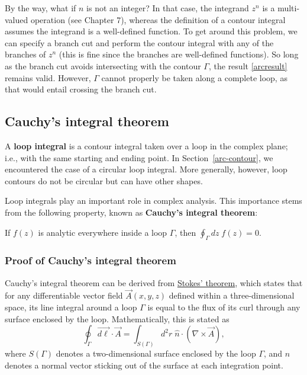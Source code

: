 \documentclass[10pt,a4paper]{article}
\begin{document}
By the way, what if $n$ is not an integer? In that case, the integrand
$z^n$ is a multi-valued operation (see Chapter 7), whereas the
definition of a contour integral assumes the integrand is a
well-defined function. To get around this problem, we can specify a
branch cut and perform the contour integral with any of the branches
of $z^n$ (this is fine since the branches are well-defined
functions). So long as the branch cut avoids intersecting with the
contour $\Gamma$, the result \eqref{arcresult} remains valid.
However, $\Gamma$ cannot properly be taken along a complete loop, as
that would entail crossing the branch cut.

\subsection{Cauchy's integral theorem}
\label{cauchys-integral-theorem}

A \textbf{loop integral} is a contour integral taken over a loop in
the complex plane; i.e., with the same starting and ending point.  In
Section~\ref{arc-contour}, we encountered the case of a circular loop
integral. More generally, however, loop contours do not be circular
but can have other shapes.

Loop integrals play an important role in complex analysis. This
importance stems from the following property, known as \textbf{Cauchy's
integral theorem}:

\begin{framed}
\centering
\noindent
If $f(z)$ is analytic everywhere inside a loop $\Gamma$, then
$\displaystyle\oint_\Gamma dz\; f(z) = 0.$
\end{framed}

\subsubsection{Proof of Cauchy's integral theorem}
\label{proof-of-cauchys-integral-theorem}

Cauchy's integral theorem can be derived from
\href{http://en.wikipedia.org/wiki/Stokes'_theorem}{Stokes' theorem},
which states that for any differentiable vector field $\vec{A}(x,y,z)$
defined within a three-dimensional space, its line integral around a
loop $\Gamma$ is equal to the flux of its curl through any surface
enclosed by the loop. Mathematically, this is stated as
\begin{equation}
\oint_\Gamma \vec{d\ell} \cdot \vec{A} = \int_{S(\Gamma)} d^2r \; \hat{n} \cdot \left(\nabla \times \vec{A}\right),
\end{equation}
where $S(\Gamma)$ denotes a two-dimensional surface enclosed by the
loop $\Gamma$, and $\hat{n}$ denotes a normal vector sticking out of
the surface at each integration point.
\end{document}
